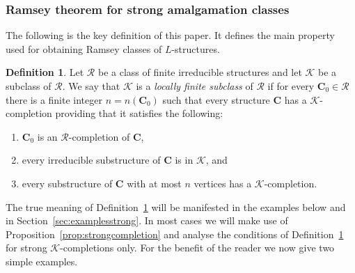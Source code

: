 \documentclass{elsarticle}
\def\str#1{\mathbf {#1}}
\def\K{{\mathcal K}}
\theoremstyle{plain}
\theoremstyle{definition}
\newtheorem{definition}[theorem]{Definition}
\theoremstyle{remark}
\begin{document}
\subsubsection{Ramsey theorem for strong amalgamation classes}
The following is the key definition of this paper. It defines the main property used for obtaining Ramsey classes of $L$-structures.
\begin{definition}
\label{def:localfinite}
Let $\mathcal R$ be a class of finite irreducible structures and let $\mathcal K$ be a subclass of $\mathcal R$. We say
that $\mathcal K$ is a \emph{locally finite subclass} of $\mathcal R$ if for every $\str{C}_0 \in \mathcal R$ there is a finite integer $n = n(\str {C}_0)$ such that 
every structure $\str C$ has a $\K$-completion providing that it satisfies the following:
\begin{enumerate}
\item $\str{C}_0$ is an $\mathcal R$-completion of $\str{C}$,
\item every irreducible substructure of $\str{C}$ is in $\K$, and
\item every substructure of $\str{C}$ with at most $n$ vertices has a $\K$-comple\-tion.
\end{enumerate}
\end{definition}
The true meaning of Definition~\ref{def:localfinite} will be manifested in the examples below and in Section~\ref{sec:examplesstrong}. In most cases we will make use of Proposition~\ref{prop:strongcompletion} and analyse the conditions of Definition~\ref{def:localfinite} for
strong $\K$-completions only.
For the benefit of the reader we now give two simple examples.
\end{document}
